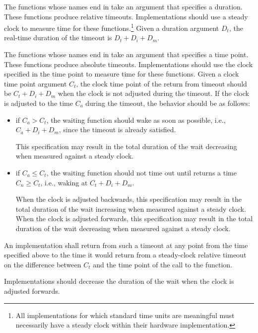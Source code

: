 \pnum
The functions whose names end in  take an argument that
specifies a duration. These functions produce relative timeouts. Implementations
should use a steady clock to measure time for these functions.\footnote{All
implementations for which standard time units are meaningful must necessarily
have a steady clock within their hardware implementation.} Given a duration
argument $D_t$, the real-time duration of the timeout is $D_t + D_i + D_m$.

\pnum
The functions whose names end in  take an argument that specifies a time
point. These functions produce absolute timeouts. Implementations should use the clock
specified in the time point to measure time for these functions. Given a clock time point
argument $C_t$, the clock time point of the return from timeout should be $C_t + D_i + D_m$
when the clock is not adjusted during the timeout. If the clock is adjusted to the time $C_a$
during the timeout, the behavior should be as follows:
\begin{itemize}
\item
if $C_a > C_t$, the waiting function should wake as soon as possible, i.e., $C_a + D_i + D_m$,
since the timeout is already satisfied.
\begin{note}
This specification may result in the total
duration of the wait decreasing when measured against a steady clock.
\end{note}

\item
if $C_a \leq C_t$, the waiting function should not time out until  returns a
time $C_n \geq C_t$, i.e., waking at $C_t + D_i + D_m$.
\begin{note}
When the clock is adjusted
backwards, this specification may result in the total duration of the wait increasing when
measured against a steady clock. When the clock is adjusted forwards, this specification may
result in the total duration of the wait decreasing when measured against a steady clock.
\end{note}
\end{itemize}

An implementation shall return from such a timeout at any point from the time specified above to
the time it would return from a steady-clock relative timeout on the difference between $C_t$
and the time point of the call to the  function.
\begin{note}
Implementations
should decrease the duration of the wait when the clock is adjusted forwards.
\end{note}

